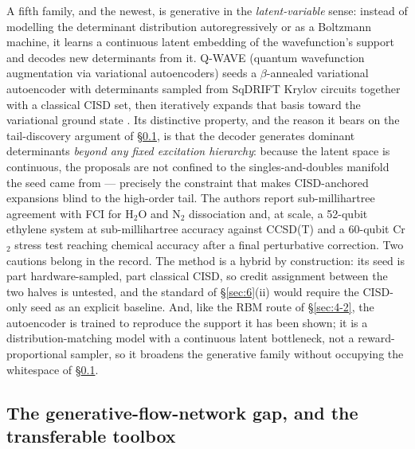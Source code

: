 \documentclass[onecolumn,a4paper]{quantumarticle}
\begin{document}
A fifth family, and the newest, is generative in the \emph{latent-variable} sense: instead of modelling the determinant distribution autoregressively or as a Boltzmann machine, it learns a continuous latent embedding of the wavefunction's support and decodes new determinants from it. Q-WAVE (quantum wavefunction augmentation via variational autoencoders) seeds a $\beta$-annealed variational autoencoder with determinants sampled from SqDRIFT Krylov circuits \cite{piccinelli2025} together with a classical CISD set, then iteratively expands that basis toward the variational ground state \cite{qwave2026}. Its distinctive property, and the reason it bears on the tail-discovery argument of \S\ref{sec:4-6}, is that the decoder generates dominant determinants \emph{beyond any fixed excitation hierarchy}: because the latent space is continuous, the proposals are not confined to the singles-and-doubles manifold the seed came from --- precisely the constraint that makes CISD-anchored expansions blind to the high-order tail. The authors report sub-millihartree agreement with FCI for H$_2$O and N$_2$ dissociation and, at scale, a 52-qubit ethylene system at sub-millihartree accuracy against CCSD(T) and a 60-qubit Cr$_2$ stress test reaching chemical accuracy after a final perturbative correction. Two cautions belong in the record. The method is a hybrid by construction: its seed is part hardware-sampled, part classical CISD, so credit assignment between the two halves is untested, and the standard of \S\ref{sec:6}(ii) would require the CISD-only seed as an explicit baseline. And, like the RBM route of \S\ref{sec:4-2}, the autoencoder is trained to reproduce the support it has been shown; it is a distribution-matching model with a continuous latent bottleneck, not a reward-proportional sampler, so it broadens the generative family without occupying the whitespace of \S\ref{sec:4-6}.


\subsection{The generative-flow-network gap, and the transferable toolbox}\label{sec:4-6}
\end{document}
